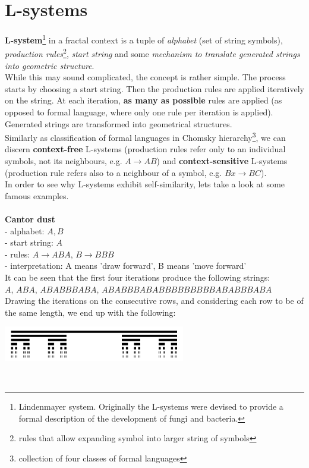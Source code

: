 \documentclass[12pt]{article}
\begin{document}
\section{L-systems}
\textbf{L-system}\footnote{Lindenmayer system. Originally the L-systems were devised to provide a formal description of the development of fungi and bacteria.} in a fractal context is a tuple of \emph{alphabet} (set of string symbols), \emph{production rules}\footnote{rules that allow expanding symbol into larger string of symbols}, \emph{start string} and some \emph{mechanism to translate generated strings into geometric structure}.\\
While this may sound complicated, the concept is rather simple. The process starts by choosing a start string. Then the production rules are applied iteratively on the string. At each iteration, \textbf{as many as possible} rules are applied (as opposed to formal language, where only one rule per iteration is applied). Generated strings are transformed into geometrical structures. \\
Similarly as classification of formal languages in Chomsky hierarchy\footnote{collection of four classes of formal languages}, we can discern
\textbf{context-free} L-systems (production rules refer only to an individual symbols, not its neighbours, e.g. $A \rightarrow AB$) and \textbf{context-sensitive} L-systems (production rule refers also to a neighbour of a symbol, e.g. $B x \rightarrow B C$). \\
In order to see why L-systems exhibit self-similarity, lets take a look at some famous examples.\\\\
\textbf{Cantor dust}\\
- alphabet: $A,B$\\
- start string: $A$\\
- rules: $A \rightarrow ABA$, $B \rightarrow BBB$\\
- interpretation: A means 'draw forward', B means 'move forward'\\
It can be seen that the first four iterations produce the following strings: \\$A$, $ABA$, $ABABBBABA$, $ABABBBABABBBBBBBBBABABBBABA$\\
Drawing the iterations on the consecutive rows, and considering each row to be of the same length, we end up with the following:\\
\centerline{\includegraphics[width = 300px]{dust}}\\
\end{document}
